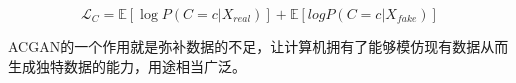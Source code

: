 \begin{equation}
\label{equ:equ_acgan_c}
\mathcal{L}_C = \mathbb{E}[\log P(C = c | X_{real})] + \mathbb{E}[logP(C = c | X_{fake})]
\end{equation}

ACGAN的一个作用就是弥补数据的不足，让计算机拥有了能够模仿现有数据从而生成独特数据的能力，用途相当广泛。













